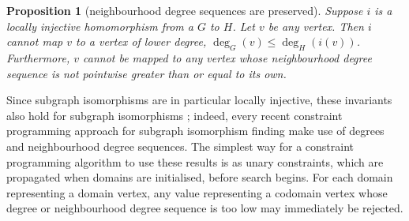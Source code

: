 \documentclass{article}
\newtheorem{proposition}{Proposition}
\newcommand{\degree}{\operatorname{deg}}
\begin{document}
\begin{proposition}[neighbourhood degree sequences are preserved]\label{proposition:degreends}
    Suppose  $i$ is a locally injective homomorphism from a $G$ to  $H$. Let
    $v$ be any vertex. Then $i$ cannot map $v$ to a vertex of lower degree, $\degree_G(v) \le \degree_H(i(v))$.
    Furthermore, $v$ cannot be mapped to any vertex whose neighbourhood degree sequence is
            not pointwise greater than or equal to its own.
\end{proposition}
Since subgraph isomorphisms are in particular locally injective, these invariants also hold for
subgraph isomorphisms \cite{DBLP:journals/constraints/ZampelliDS10}; indeed, every recent constraint
programming approach for subgraph isomorphism finding make use of degrees and neighbourhood degree
sequences. The simplest way for a constraint programming algorithm to use these results is as unary
constraints, which are propagated when domains are initialised, before search begins. For each
domain representing a domain vertex, any value representing a codomain vertex whose degree or
neighbourhood degree sequence is too low may immediately be rejected.
\end{document}
